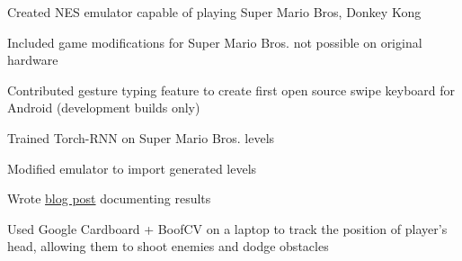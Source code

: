 \documentclass[12pt]{jmichaud-resume}
\begin{document}
\begin{minipage}[t]{0.49\textwidth} 

 \hfill
{}
\begin{tightemize}
	\item Created NES emulator capable of playing Super Mario Bros, Donkey Kong
	\item Included game modifications for Super Mario Bros. not possible on original hardware
\end{tightemize}
\sectionsep

\end{minipage} 
\hfill
\begin{minipage}[t]{0.49\textwidth}

 \hfill
{}
\begin{tightemize}
	\item Contributed gesture typing feature to create first open source swipe keyboard for Android (development builds only)
\end{tightemize}
\sectionsep

\end{minipage} 
\hfill
\begin{minipage}[t]{0.49\textwidth}

 \hfill
{}
\begin{tightemize}
	\item Trained Torch-RNN on Super Mario Bros. levels
	\item Modified emulator to import generated levels
	\item Wrote  \href{https://medium.com/@justin_michaud/super-mario-bros-level-generation-using-torch-rnn-726ddea7e9b7}{blog post} documenting results
\end{tightemize}
\sectionsep

\end{minipage} 
\hfill
\begin{minipage}[t]{0.49\textwidth}

 \hfill
{}
\begin{tightemize}
	\item Used Google Cardboard + BoofCV on a laptop to track the position of player’s head, allowing them to shoot enemies and dodge obstacles
\end{tightemize}
\sectionsep
\end{minipage}
\end{document}
